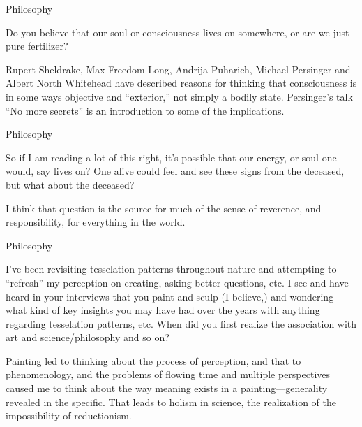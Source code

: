 \documentclass[11pt,oneside,openany,extrafontsizes]{memoir}
\begin{document}
\begin{qaexchange}{Philosophy}

    \begin{question}
        Do you believe that our soul or consciousness lives on somewhere, or are we just pure fertilizer?
    \end{question}

    \begin{answer}
        Rupert Sheldrake, Max Freedom Long, Andrija Puharich, Michael Persinger and Albert North Whitehead have described reasons for thinking that consciousness is in some ways objective and \enquote{exterior,} not simply a bodily state. Persinger's talk \enquote{No more secrets} is an introduction to some of the implications.
    \end{answer}
\end{qaexchange}

\begin{qaexchange}{Philosophy}

    \begin{question}
        So if I am reading a lot of this right, it's possible that our energy, or soul one would, say lives on? One alive could feel and see these signs from the deceased, but what about the deceased?
    \end{question}

    \begin{answer}
        I think that question is the source for much of the sense of reverence, and responsibility, for everything in the world.
    \end{answer}
\end{qaexchange}

\begin{emailexchange}{Philosophy}

    \begin{question}
        I've been revisiting tesselation patterns throughout nature and attempting to \enquote{refresh} my perception on creating, asking better questions, etc. I see and have heard in your interviews that you paint and sculp (I believe,) and wondering what kind of key insights you may have had over the years with anything regarding tesselation patterns, etc. When did you first realize the association with art and science/philosophy and so on?
    \end{question}

    \begin{answer}
        Painting led to thinking about the process of perception, and that to phenomenology, and the problems of flowing time and multiple perspectives caused me to think about the way meaning exists in a painting—generality revealed in the specific. That leads to holism in science, the realization of the impossibility of reductionism.
    \end{answer}
\end{emailexchange}
\end{document}
